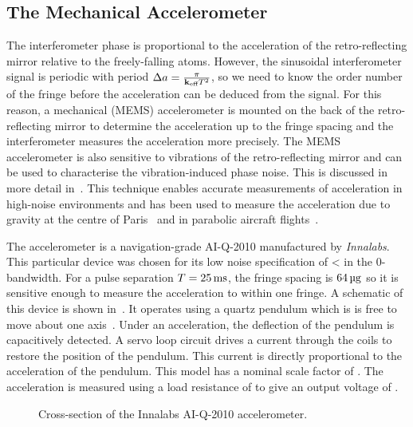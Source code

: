 \subsection{The Mechanical Accelerometer}\label{subsec:raman_mems}
The interferometer phase is proportional to the acceleration of the
retro-reflecting mirror relative to the freely-falling atoms. However,
the sinusoidal interferometer signal is periodic with period
\(\Delta a = \frac{\pi}{{\textbf k_\textnormal{eff}} T^2}\), so we need to know the order
number of the fringe before the acceleration can be deduced from the
signal. For this reason, a mechanical (MEMS)
accelerometer is mounted on the back of the retro-reflecting mirror to determine the acceleration up to the fringe spacing and the interferometer measures the acceleration more
precisely. 
The MEMS accelerometer is also sensitive to vibrations of the
retro-reflecting mirror and can be used to characterise the
vibration-induced phase noise. This is discussed in more detail
in~. This technique enables
accurate measurements of acceleration in high-noise environments and has been
used to measure the acceleration due to gravity at the centre of
Paris~\cite{Merlet2009} and in parabolic aircraft
flights~\cite{Geiger2011a,Barrett2016}. 
\par\noindent 
The accelerometer is a navigation-grade AI-Q-2010 manufactured by \textit{Innalabs}. This particular
device was chosen for its low noise specification of
< in the 0- bandwidth. For a pulse separation \(T
= \sivalue{25}{\milli\second}\), the fringe spacing is
\(\sivalue{64}{\micro\g}\) so it is sensitive enough to measure the
acceleration to within one fringe. A schematic of this device is shown
in~. It operates using a quartz pendulum which is is
free to move about one
axis~\cite{Foote1992,Lawrence1998}\nocite{Lawrence1998a}. Under an acceleration, the
deflection of the pendulum is capacitively detected. A servo loop circuit drives
a current through the coils to restore the position of the pendulum. This
current is directly proportional to the acceleration of the pendulum. This model
has a nominal scale factor of . The
acceleration is measured using a load resistance of  to
give an output voltage of .
\begin{figure}[!htbp] \centering
	\resizebox{0.5\textwidth}{!}{}
	\caption[Innalabs accelerometer cross-section]{Cross-section of the Innalabs
		AI-Q-2010 accelerometer.} \label{fig:innalabs}
\end{figure}

